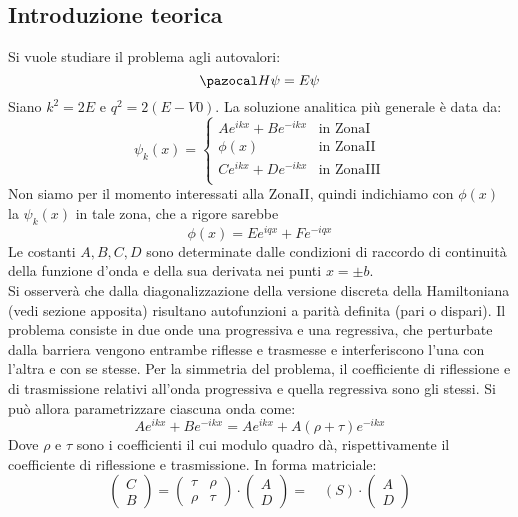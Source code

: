 \subsection*{Introduzione teorica}

Si vuole studiare il problema agli autovalori:
$$ \Hh\psi = E \psi $$
%
Siano $k^2 = 2E$ e  $q^2 = 2(E-V0)$. La soluzione analitica più generale è data da:
%
$$
\psi_k(x) =
    \begin{cases}
        Ae^{ikx}+Be^{-ikx} & \mbox{in ZonaI} \\
        \phi(x) & \mbox{in ZonaII} \\
        Ce^{ikx}+De^{-ikx} & \mbox{in ZonaIII} \\
    \end{cases}
$$
%
\bigskip
Non siamo per il momento interessati alla ZonaII, quindi indichiamo con
$\phi(x)$ la $\psi_k(x)$ in tale zona, che a rigore sarebbe
    $$\phi(x)= Ee^{iqx}+Fe^{-iqx}$$
Le costanti $A,B,C,D$ sono determinate dalle condizioni di raccordo di continuità della
funzione d'onda e della sua derivata nei punti $x=\pm b$.\\
Si osserverà che dalla diagonalizzazione della versione discreta della Hamiltoniana
(vedi sezione apposita) risultano autofunzioni a parità definita (pari o dispari).
Il problema consiste in due onde una progressiva e una regressiva, che perturbate
dalla barriera vengono entrambe riflesse e trasmesse e interferiscono l'una con
l'altra e con se stesse.
Per la simmetria del problema, il coefficiente di riflessione e di trasmissione
relativi all'onda progressiva e quella regressiva sono gli stessi.
Si può allora parametrizzare ciascuna onda come:
    $$ Ae^{ikx} + Be^{-ikx} = Ae^{ikx} + A(\rho + \tau)e^{-ikx} $$
Dove $\rho$ e $\tau$ sono i coefficienti il cui modulo quadro dà, rispettivamente
il coefficiente di riflessione e trasmissione.
In forma matriciale:
$$
    \begin{pmatrix} C \\ B \end{pmatrix} =
    \begin{pmatrix} \tau & \rho \\ \rho & \tau \end{pmatrix} \cdot
    \begin{pmatrix} A \\ D \end{pmatrix} = \quad (S)\cdot \begin{pmatrix} A \\ D \end{pmatrix}
$$
